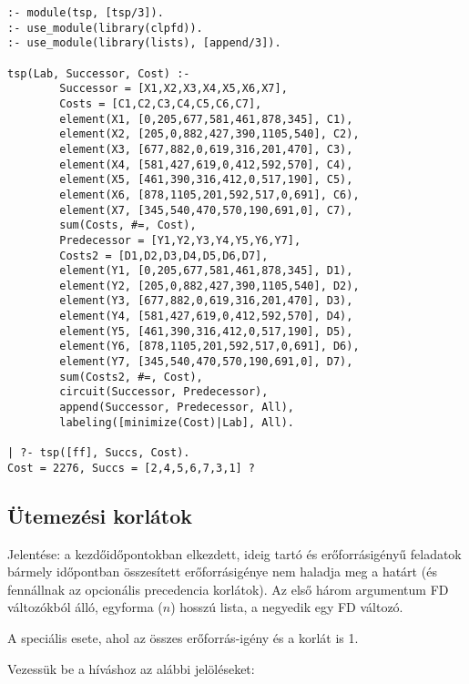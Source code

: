 \begin{verbatim}
:- module(tsp, [tsp/3]).
:- use_module(library(clpfd)).
:- use_module(library(lists), [append/3]).

tsp(Lab, Successor, Cost) :-
        Successor = [X1,X2,X3,X4,X5,X6,X7],
        Costs = [C1,C2,C3,C4,C5,C6,C7],
        element(X1, [0,205,677,581,461,878,345], C1),
        element(X2, [205,0,882,427,390,1105,540], C2),
        element(X3, [677,882,0,619,316,201,470], C3),
        element(X4, [581,427,619,0,412,592,570], C4),
        element(X5, [461,390,316,412,0,517,190], C5),
        element(X6, [878,1105,201,592,517,0,691], C6),
        element(X7, [345,540,470,570,190,691,0], C7),
        sum(Costs, #=, Cost),
        Predecessor = [Y1,Y2,Y3,Y4,Y5,Y6,Y7],
        Costs2 = [D1,D2,D3,D4,D5,D6,D7],
        element(Y1, [0,205,677,581,461,878,345], D1),
        element(Y2, [205,0,882,427,390,1105,540], D2),
        element(Y3, [677,882,0,619,316,201,470], D3),
        element(Y4, [581,427,619,0,412,592,570], D4),
        element(Y5, [461,390,316,412,0,517,190], D5),
        element(Y6, [878,1105,201,592,517,0,691], D6),
        element(Y7, [345,540,470,570,190,691,0], D7),
        sum(Costs2, #=, Cost),
        circuit(Successor, Predecessor),
        append(Successor, Predecessor, All),
        labeling([minimize(Cost)|Lab], All).

| ?- tsp([ff], Succs, Cost).
Cost = 2276, Succs = [2,4,5,6,7,3,1] ?
\end{verbatim}

\subsection{Ütemezési korlátok}

{}

Jelentése: a  kezdőidőpontokban elkezdett,  ideig tartó
és  erőforrásigényű feladatok bármely időpontban összesített
erőforrásigénye nem haladja meg a  határt (és fennállnak az opcionális
precedencia korlátok). Az első három argumentum FD változókból álló, egyforma ($n$)
hosszú lista, a negyedik egy FD változó.

\medskip

{}

A  speciális esete, ahol az összes erőforrás-igény és a korlát is 1.

\br
Vezessük be a  híváshoz az alábbi jelöléseket:


